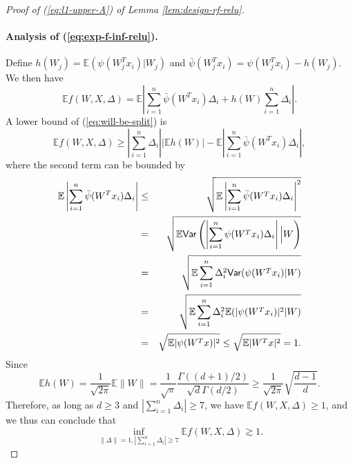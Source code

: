 \begin{proof}[Proof of (\ref{eq:l1-upper-A}) of Lemma \ref{lem:design-rf-relu}]
\paragraph{Analysis of (\ref{eq:exp-f-inf-relu}).} Define $h(W_j)=\mathbb{E}(\psi(W_j^Tx_i)|W_j)$ and $\bar{\psi}(W_j^Tx_i)=\psi(W_j^Tx_i)-h(W_j)$. We then have
\begin{equation}
\mathbb{E}f(W,X,\Delta)=\mathbb{E}\left|\sum_{i=1}^n\bar{\psi}(W^Tx_i)\Delta_i+h(W)\sum_{i=1}^n\Delta_i\right|. \label{eq:will-be-split}
\end{equation}
A lower bound of (\ref{eq:will-be-split}) is
$$\mathbb{E}f(W,X,\Delta)\geq \left|\sum_{i=1}^n\Delta_i\right|\left|\mathbb{E}h(W)\right|-\mathbb{E}\left|\sum_{i=1}^n\bar{\psi}(W^Tx_i)\Delta_i\right|,$$
where the second term can be bounded by
\begin{eqnarray*}
\mathbb{E}\left|\sum_{i=1}^n\bar{\psi}(W^Tx_i)\Delta_i\right| &\leq& \sqrt{\mathbb{E}\left|\sum_{i=1}^n\bar{\psi}(W^Tx_i)\Delta_i\right|^2} \\
&=& \sqrt{\mathbb{E}\Var\left(\left|\sum_{i=1}^n\psi(W^Tx_i)\Delta_i\right|\Big|W\right)} \\
&=& \sqrt{\mathbb{E}\sum_{i=1}^n\Delta_i^2\Var(\psi(W^Tx_i)|W)} \\
&=& \sqrt{\mathbb{E}\sum_{i=1}^n\Delta_i^2\mathbb{E}(|\psi(W^Tx_i)|^2|W)} \\
&=& \sqrt{\mathbb{E}|\psi(W^Tx)|^2} \leq \sqrt{\mathbb{E}|W^Tx|^2} = 1.
\end{eqnarray*}
Since
$$\mathbb{E}h(W)=\frac{1}{\sqrt{2\pi}}\mathbb{E}\|W\|=\frac{1}{\sqrt{\pi}}\frac{\Gamma((d+1)/2)}{\sqrt{d}\Gamma(d/2)}\geq \frac{1}{\sqrt{2\pi}}\sqrt{\frac{d-1}{d}}.$$
Therefore, as long as $d\geq 3$ and $\left|\sum_{i=1}^n\Delta_i\right|\geq 7$, we have $\mathbb{E}f(W,X,\Delta)\geq 1$, and we thus can conclude that
\begin{equation}
\inf_{\|\Delta\|=1,|\sum_{i=1}^n\Delta_i|\geq 7}\mathbb{E}f(W,X,\Delta) \gtrsim 1.\label{eq:l1-1-1}
\end{equation}


\end{proof}

